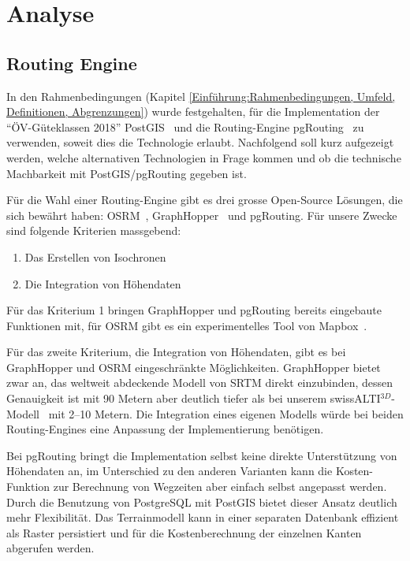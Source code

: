 
\section{Analyse}
\label{Analyse}

\subsection{Routing Engine}
\label{Analyse:Routing Engine}

In den Rahmenbedingungen (Kapitel \ref{Einführung:Rahmenbedingungen, Umfeld, Definitionen, Abgrenzungen}) wurde festgehalten, für die Implementation der "`\acs{ÖV}-Güteklassen 2018"' PostGIS~\cite{postgis} und die Routing-Engine pgRouting~\cite{pgRouting} zu verwenden, soweit dies die Technologie erlaubt.
Nachfolgend soll kurz aufgezeigt werden, welche alternativen Technologien in Frage kommen und ob die technische Machbarkeit mit PostGIS/pgRouting gegeben ist.

Für die Wahl einer Routing-Engine gibt es drei grosse Open-Source Lösungen, die sich bewährt haben: OSRM~\cite{osrm}, GraphHopper~\cite{graphhopper} und pgRouting.
Für unsere Zwecke sind folgende Kriterien massgebend:

\begin{enumerate}
    \item Das Erstellen von Isochronen
    \item Die Integration von Höhendaten
\end{enumerate}

Für das Kriterium 1 bringen GraphHopper und pgRouting bereits eingebaute Funktionen mit, für OSRM gibt es ein experimentelles Tool von Mapbox~\cite{mapbox_osrm_isochrone}.

Für das zweite Kriterium, die Integration von Höhendaten, gibt es bei GraphHopper und OSRM eingeschränkte Möglichkeiten. GraphHopper bietet zwar an, das weltweit abdeckende Modell von \ac{SRTM} direkt einzubinden, dessen Genauigkeit ist mit 90 Metern aber deutlich tiefer als bei unserem swissALTI$^{3D}$-Modell~\cite{swissalti3d_swisstopo} mit 2--10 Metern. Die Integration eines eigenen Modells würde bei beiden Routing-Engines eine Anpassung der Implementierung benötigen.

Bei pgRouting bringt die Implementation selbst keine direkte Unterstützung von Höhendaten an, im Unterschied zu den anderen Varianten kann die Kosten-Funktion zur Berechnung von Wegzeiten aber einfach selbst angepasst werden.
Durch die Benutzung von PostgreSQL mit PostGIS bietet dieser Ansatz deutlich mehr Flexibilität.
Das Terrainmodell kann in einer separaten Datenbank effizient als Raster persistiert und für die Kostenberechnung der einzelnen Kanten abgerufen werden.

